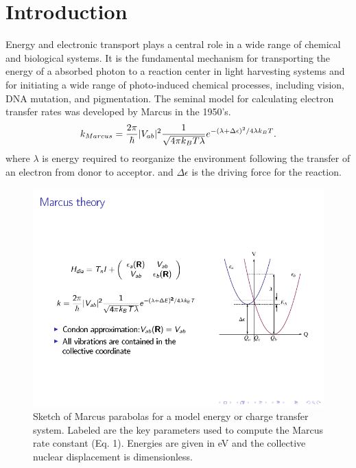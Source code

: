 \section{Introduction}
\label{sec:intro}

Energy and electronic transport plays a central role in a
wide range of  chemical  and biological systems.
It is the fundamental mechanism for transporting the  energy  of a
absorbed photon to a reaction center in light harvesting systems
and for initiating a wide range of photo-induced  chemical processes,
including vision, DNA mutation, and pigmentation.
The seminal model for calculating electron transfer rates was developed by
Marcus in the 1950's\cite{marcus1956theory,marcus1965theory,marcus1993electron}.
\begin{equation}
k_{Marcus}=\frac{2\pi}{\hbar}|V_{ab}|^{2}\frac{1}{\sqrt{4\text{\ensuremath{\pi}}k_{B}T\lambda}}e^{-(\lambda+ \Delta\epsilon)^{2}/4\text{\ensuremath{\lambda}}k_{B}T}.\label{eq:marcus}
\end{equation}
where $\lambda$ is  energy required to reorganize the environment
following the transfer of an electron from donor to acceptor.
and $\Delta \epsilon$ is the driving force for the reaction.

\begin{figure}[b]
\includegraphics[width=0.5\columnwidth]{Chapters/chap2/Figure1}
\caption{Sketch of Marcus parabolas for a model energy or charge transfer system.
Labeled are the key parameters used to compute the Marcus rate constant (Eq. 1).
Energies are given in eV and the collective nuclear displacement  is dimensionless.
}
\label{marcus}
\end{figure}


